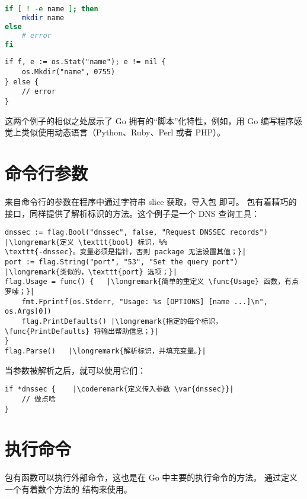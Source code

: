 \begin{minipage}{.5\textwidth}
\begin{lstlisting}[language=sh,caption={Create a directory with the shell}]
if [ ! -e name ]; then
    mkdir name
else
    # error
fi
\end{lstlisting}
\end{minipage}
\hspace{1em}
\begin{minipage}{.5\textwidth}
\begin{lstlisting}[caption={Create a directory with Go}]
if f, e := os.Stat("name"); e != nil {
    os.Mkdir("name", 0755)
} else {
    // error
}
\end{lstlisting}
\end{minipage}
这两个例子的相似之处展示了 Go 拥有的``脚本''化特性，例如，用 Go  编写程序感觉上类似使用动态语言（Python、Ruby、Perl 或者 PHP）。

\section{命令行参数}
\label{sec:option parsing}
来自命令行的参数在程序中通过字符串 slice  获取，导入包  即可。
 包有着精巧的接口，同样提供了解析标识的方法。这个例子是一个 DNS 查询工具：
\begin{lstlisting}
dnssec := flag.Bool("dnssec", false, "Request DNSSEC records") |\longremark{定义 \texttt{bool} 标识，%%
\texttt{-dnssec}。变量必须是指针，否则 package 无法设置其值；}|
port := flag.String("port", "53", "Set the query port")      |\longremark{类似的，\texttt{port} 选项；}|
flag.Usage = func() {   |\longremark{简单的重定义 \func{Usage} 函数，有点罗嗦；}|
    fmt.Fprintf(os.Stderr, "Usage: %s [OPTIONS] [name ...]\n", os.Args[0])
    flag.PrintDefaults() |\longremark{指定的每个标识，\func{PrintDefaults} 将输出帮助信息；}|
}
flag.Parse()   |\longremark{解析标识，并填充变量。}|
\end{lstlisting}
\showremarks
当参数被解析之后，就可以使用它们：
\begin{lstlisting}
if *dnssec {    |\coderemark{定义传入参数 \var{dnssec}}|
    // 做点啥
}
\end{lstlisting}

\section{执行命令}
 包有函数可以执行外部命令，这也是在 Go 中主要的执行命令的方法。
通过定义一个有着数个方法的  结构来使用。


